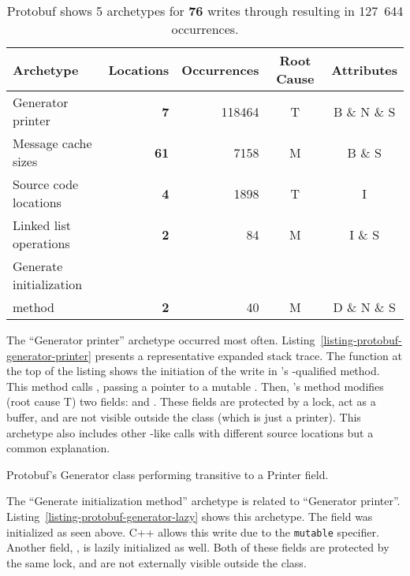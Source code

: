 \begin{table}[!htb]
  \centering
  \caption{Protobuf shows 5 archetypes for {\bf 76} writes through \const{} resulting in 127~644
           occurrences.}
  \label{table:protobuf-violations}
  \begin{tabular}{l r r c c}
    \textbf{Archetype} & \textbf{Locations} & \textbf{Occurrences}
                     & \textbf{Root Cause} & \textbf{Attributes} \\
    \midrule
    Generator printer & {\bf 7} & 118464  & T & B \& N \& S \\
    Message cache sizes & {\bf 61} & 7158 & M & B \& S \\
    Source code locations & {\bf 4} & 1898 & T & I \\
    Linked list operations & {\bf 2} & 84 & M & I \& S \\
    Generate initialization \\
    \hspace*{2em}  method & {\bf 2} & 40 &  M & D \& N \& S \\
  \end{tabular}
\end{table}

The ``Generator printer'' archetype occurred most often.
Listing~\ref{listing-protobuf-generator-printer} presents a representative
expanded stack trace.
The function at the top of the listing shows the initiation of the write in
's \const-qualified  method.
This method calls , passing a pointer to a mutable
.
Then, 's  method modifies (root cause T) two fields:
 and .
These fields are protected by a lock, act as a buffer, and are not visible
outside the class (which is just a printer).
This archetype also includes other -like calls with different source
locations but a common explanation.

\begin{listing}[!htb]
  \caption{Protobuf's Generator class performing transitive \wtc{} to a Printer
           field.}
  \label{listing-protobuf-generator-printer}
  \centering
  
\end{listing}

The ``Generate initialization method'' archetype is related to ``Generator
printer''.
Listing~\ref{listing-protobuf-generator-lazy} shows this archetype.
The  field was initialized as seen above.
C++ allows this write due to the \texttt{mutable} specifier.
Another field, , is lazily initialized as well.
Both of these fields are protected by the same lock, and are not externally
visible outside the class.

